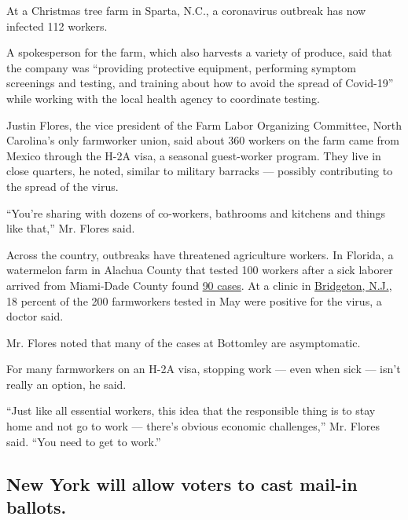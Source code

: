At a Christmas tree farm in Sparta, N.C., a coronavirus outbreak has now
infected 112 workers.

A spokesperson for the farm, which also harvests a variety of produce,
said that the company was ``providing protective equipment, performing
symptom screenings and testing, and training about how to avoid the
spread of Covid-19'' while working with the local health agency to
coordinate testing.

Justin Flores, the vice president of the Farm Labor Organizing
Committee, North Carolina's only farmworker union, said about 360
workers on the farm came from Mexico through the H-2A visa, a seasonal
guest-worker program. They live in close quarters, he noted, similar to
military barracks --- possibly contributing to the spread of the virus.

``You're sharing with dozens of co-workers, bathrooms and kitchens and
things like that,'' Mr. Flores said.

Across the country, outbreaks have threatened agriculture workers. In
Florida, a watermelon farm in Alachua County that tested 100 workers
after a sick laborer arrived from Miami-Dade County found
\href{https://slack-redir.net/link?url=https\%3A\%2F\%2Fwww.nytimes3xbfgragh.onion\%2F2020\%2F06\%2F18\%2Fus\%2Fflorida-coronavirus-immokalee-farmworkers.html}{90
cases}. At a clinic in
\href{https://slack-redir.net/link?url=https\%3A\%2F\%2Fwww.nytimes3xbfgragh.onion\%2F2020\%2F07\%2F05\%2Fnyregion\%2Fnj-migrant-workers-covid-19.html}{Bridgeton,
N.J.}, 18 percent of the 200 farmworkers tested in May were positive for
the virus, a doctor said.

Mr. Flores noted that many of the cases at Bottomley are asymptomatic.

For many farmworkers on an H-2A visa, stopping work --- even when sick
--- isn't really an option, he said.

``Just like all essential workers, this idea that the responsible thing
is to stay home and not go to work --- there's obvious economic
challenges,'' Mr. Flores said. ``You need to get to work.''

\begin{quote}
\end{quote}

\hypertarget{new-york-will-allow-voters-to-cast-mail-in-ballots}{%
\subsection{New York will allow voters to cast mail-in
ballots.}\label{new-york-will-allow-voters-to-cast-mail-in-ballots}}

